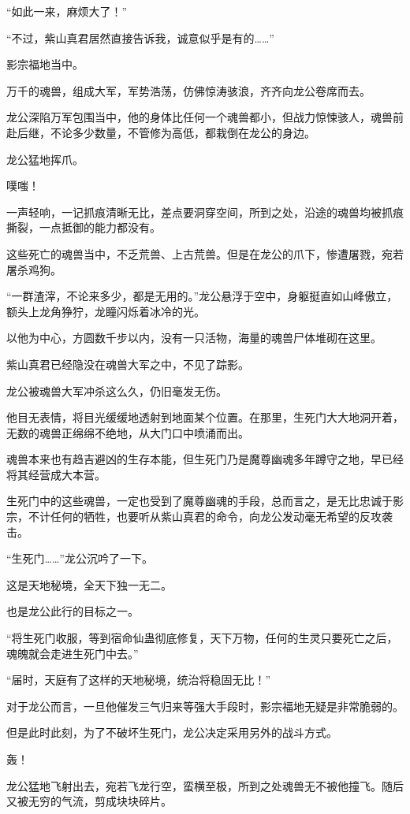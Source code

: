 \begin{this_body}
“如此一来，麻烦大了！”

“不过，紫山真君居然直接告诉我，诚意似乎是有的……”

影宗福地当中。

万千的魂兽，组成大军，军势浩荡，仿佛惊涛骇浪，齐齐向龙公卷席而去。

龙公深陷万军包围当中，他的身体比任何一个魂兽都小，但战力惊悚骇人，魂兽前赴后继，不论多少数量，不管修为高低，都栽倒在龙公的身边。

龙公猛地挥爪。

噗嗤！

一声轻响，一记抓痕清晰无比，差点要洞穿空间，所到之处，沿途的魂兽均被抓痕撕裂，一点抵御的能力都没有。

这些死亡的魂兽当中，不乏荒兽、上古荒兽。但是在龙公的爪下，惨遭屠戮，宛若屠杀鸡狗。

“一群渣滓，不论来多少，都是无用的。”龙公悬浮于空中，身躯挺直如山峰傲立，额头上龙角狰狞，龙瞳闪烁着冰冷的光。

以他为中心，方圆数千步以内，没有一只活物，海量的魂兽尸体堆砌在这里。

紫山真君已经隐没在魂兽大军之中，不见了踪影。

龙公被魂兽大军冲杀这么久，仍旧毫发无伤。

他目无表情，将目光缓缓地透射到地面某个位置。在那里，生死门大大地洞开着，无数的魂兽正绵绵不绝地，从大门口中喷涌而出。

魂兽本来也有趋吉避凶的生存本能，但生死门乃是魔尊幽魂多年蹲守之地，早已经将其经营成大本营。

生死门中的这些魂兽，一定也受到了魔尊幽魂的手段，总而言之，是无比忠诚于影宗，不计任何的牺牲，也要听从紫山真君的命令，向龙公发动毫无希望的反攻袭击。

“生死门……”龙公沉吟了一下。

这是天地秘境，全天下独一无二。

也是龙公此行的目标之一。

“将生死门收服，等到宿命仙蛊彻底修复，天下万物，任何的生灵只要死亡之后，魂魄就会走进生死门中去。”

“届时，天庭有了这样的天地秘境，统治将稳固无比！”

对于龙公而言，一旦他催发三气归来等强大手段时，影宗福地无疑是非常脆弱的。

但是此时此刻，为了不破坏生死门，龙公决定采用另外的战斗方式。

轰！

龙公猛地飞射出去，宛若飞龙行空，蛮横至极，所到之处魂兽无不被他撞飞。随后又被无穷的气流，剪成块块碎片。


\end{this_body}
